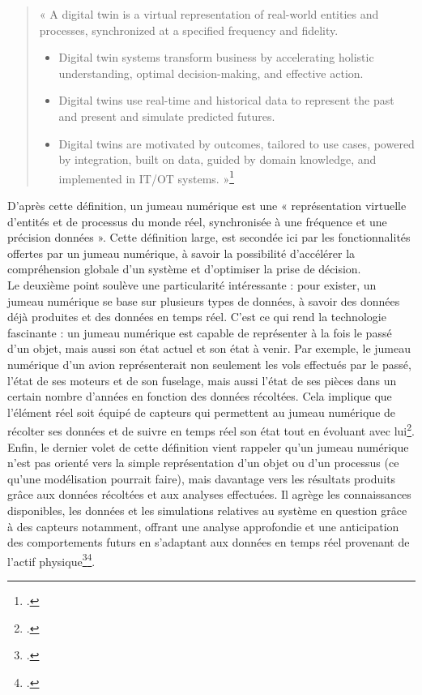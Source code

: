 \begin{quote}« A digital twin is a virtual representation of real-world entities and processes, synchronized at a specified frequency and fidelity.
\begin{itemize}
\item Digital twin systems transform business by accelerating holistic understanding, optimal decision-making, and effective action.
\item Digital twins use real-time and historical data to represent the past and present and simulate predicted futures.
\item Digital twins are motivated by outcomes, tailored to use cases, powered by integration, built on data, guided by domain knowledge, and implemented in IT/OT systems. »\footcite{DefinitionDigitalTwin}
\end{itemize}
\end{quote}

D'après cette définition, un jumeau numérique est une « représentation virtuelle d’entités et de processus du monde réel, synchronisée à une fréquence et une précision données ». Cette définition large, est secondée ici par les fonctionnalités offertes par un jumeau numérique, à savoir la possibilité d’accélérer la compréhension globale d’un système et d’optimiser la prise de décision.\\ 

Le deuxième point soulève une particularité intéressante : pour exister, un jumeau numérique se base sur plusieurs types de données, à savoir des données déjà produites et des données en temps réel. C'est ce qui rend la technologie fascinante : un jumeau numérique est capable de représenter à la fois le passé d’un objet, mais aussi son état actuel et son état à venir. Par exemple, le jumeau numérique d’un avion représenterait non seulement les vols effectués par le passé, l’état de ses moteurs et de son fuselage, mais aussi l’état de ses pièces dans un certain nombre d’années en fonction des données récoltées. Cela implique que l'élément réel soit équipé de capteurs qui permettent au jumeau numérique de récolter ses données et de suivre en temps réel son état tout en évoluant avec lui\footcite{gladieuxJumeauNumeriqueAeronautique2019}.\\ 

Enfin, le dernier volet de cette définition vient rappeler qu’un jumeau numérique n’est pas orienté vers la simple représentation d’un objet ou d’un processus (ce qu'une modélisation pourrait faire), mais davantage vers les résultats produits grâce aux données récoltées et aux analyses effectuées. Il agrège les connaissances disponibles, les données et les simulations relatives au système en question grâce à des capteurs notamment, offrant une analyse approfondie et une anticipation des comportements futurs en s'adaptant aux données en temps réel provenant de l'actif physique\footcite{bealJumeauNumeriqueRealite}\footcite{QuEstceQu2023}.\\

